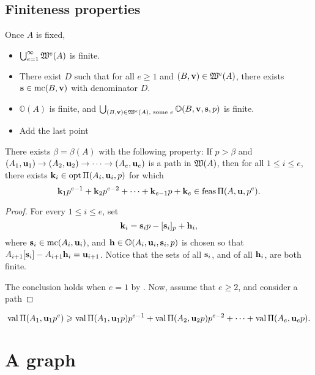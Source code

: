 \documentclass[11pt]{amsart}
\begin{document}
\subsection*{Finiteness properties}

Once $A$ is fixed,
\begin{itemize}
 \item $\bigcup_{e=1}^\infty \mathfrak{W}^e(A)$ is finite.
 \item There exist $D$ such that for all $e \geq 1$ and $(B, \mathbf{v}) \in \mathfrak{W}^e(A)$, there exists $\mathbf{s} \in \operatorname{mc}(B, \mathbf{v})$ with denominator $D$. 
 \item $\mathbb{O}(A)$ is finite, and $\bigcup_{(B, \mathbf{v}) \in \mathfrak{W}^e(A), \text{ some } e} \mathbb{O}(B, \mathbf{v}, \mathbf{s}, p)$ is finite.
 \item Add the last point
\end{itemize}


\begin{theorem}
 There exists $\beta = \beta(A)$ with the following property:  If $p>\beta$ and $(A_1, \mathbf{u}_1) \to (A_2, \mathbf{u}_2) \to \cdots \to (A_e, \mathbf{u}_e)$ is a path in $\mathfrak{W}(A)$, then for all $1 \leq i \leq e$, there exists $\mathbf{k}_i \in \operatorname{opt} \Pi(A_i, \mathbf{u}_i,p)$  for which 
 \[
  \mathbf{k}_1 p^{e-1} + \mathbf{k}_2 p^{e-2} + \cdots + \mathbf{k}_{e-1} p + \mathbf{k}_e \in \operatorname{feas} \Pi(A, \mathbf{u}, p^e).
 \]
\end{theorem}

\begin{proof}
For every $1 \leq i \leq e$, set 
 \[
\mathbf{k}_i = \mathbf{s}_i p - [\mathbf{s}_i]_p + \mathbf{h}_i,
\]
where $\mathbf{s}_i \in \operatorname{mc}(A_i, \mathbf{u}_i)$, and $\mathbf{h} \in \mathbb{O}(A_i, \mathbf{u}_i, \mathbf{s}_i, p)$ is chosen so that $A_{i+1} [\mathbf{s}_i] - A_{i+1} \mathbf{h}_i = \mathbf{u}_{i+1}$.
Notice that the sets of all $\mathbf{s}_i$, and of all $\mathbf{h}_i$, are both finite. 

The conclusion holds when $e=1$ by . 
Now, assume that $e \geq 2$, and consider a path

\end{proof}

\begin{corollary}
 \[ \operatorname{val} \Pi(A_1, \mathbf{u}_1 p^e) \geqslant \operatorname{val} \Pi(A_1, \mathbf{u}_1 p) p^{e-1} + \operatorname{val} \Pi(A_2, \mathbf{u}_2 p) p^{e-2} + \cdots + \operatorname{val} \Pi(A_{e}, \mathbf{u}_{e} p).
\]
\end{corollary}


\newpage


\section{A graph}
\end{document}
